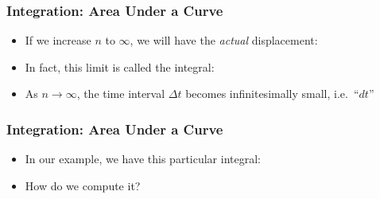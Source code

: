 \documentclass[12pt,compress,aspectratio=169]{beamer}
\begin{document}
\begin{frame}
  \frametitle{Integration: Area Under a Curve}
  \begin{itemize}
  \item If we increase $n$ to $\infty$, we will have the \emph{actual}
    displacement:

  \item In fact, this limit is called the integral:
    
  \item As $n\rightarrow\infty$, the time interval $\Delta t$ becomes
    infinitesimally small, i.e.\  ``$dt$''
  \end{itemize}
\end{frame}

\begin{frame}
  \frametitle{Integration: Area Under a Curve}
  \begin{itemize}
  \item In our example, we have this particular integral:
    
  \item How do we compute it?
  \end{itemize}
\end{frame}
\end{document}
